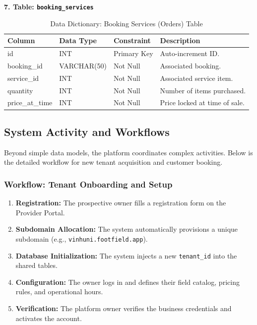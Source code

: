\textbf{7. Table: \texttt{booking\_services}}
\begin{table}[htbp]
\centering
\begin{tabularx}{\textwidth}{|l|l|l|X|}
\hline
\rowcolor{LightCyan}
\textbf{Column} & \textbf{Data Type} & \textbf{Constraint} & \textbf{Description} \\ \hline
id & INT & Primary Key & Auto-increment ID. \\ \hline
booking\_id & VARCHAR(50) & Not Null & Associated booking. \\ \hline
service\_id & INT & Not Null & Associated service item. \\ \hline
quantity & INT & Not Null & Number of items purchased. \\ \hline
price\_at\_time & INT & Not Null & Price locked at time of sale. \\ \hline
\end{tabularx}
\caption{Data Dictionary: Booking Services (Orders) Table}
\end{table}

\subsection{System Activity and Workflows}
Beyond simple data models, the platform coordinates complex activities. Below is the detailed workflow for new tenant acquisition and customer booking.

\subsubsection{Workflow: Tenant Onboarding and Setup}
\begin{enumerate}
    \item \textbf{Registration:} The prospective owner fills a registration form on the Provider Portal.
    \item \textbf{Subdomain Allocation:} The system automatically provisions a unique subdomain (e.g., \texttt{vinhuni.footfield.app}).
    \item \textbf{Database Initialization:} The system injects a new \texttt{tenant\_id} into the shared tables.
    \item \textbf{Configuration:} The owner logs in and defines their field catalog, pricing rules, and operational hours.
    \item \textbf{Verification:} The platform owner verifies the business credentials and activates the account.
\end{enumerate}

